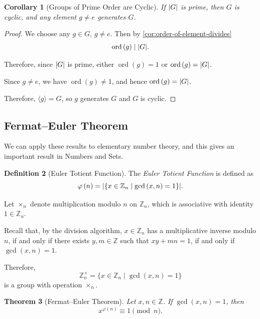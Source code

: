 \documentclass{article}
\newtheorem{theorem}{Theorem}[section]
\newtheorem{corollary}[theorem]{Corollary}
\theoremstyle{definition}
\newtheorem{definition}[theorem]{Definition}
\theoremstyle{remark}
\DeclarePairedDelimiter{\abs}{\lvert}{\rvert}
\newcommand{\pqty}[1]{\left(#1\right)}
\newcommand{\angBrac}[1]{\langle #1\rangle}
\newcommand{\set}[2]{\{#1\mid #2\}}
\newcommand{\divides}{\mid}
\newcommand{\ZZ}{\mathbb{Z}}
\newcommand{\ord}{\operatorname{ord}}
\newcommand{\totient}{\varphi}
\begin{document}
\begin{corollary}[Groups of Prime Order are Cyclic]
    \label{cor:group-prime-order}%
    If \(\abs{G}\) is prime, then \(G\) is cyclic, and \emph{any} element \(g \neq e\) generates \(G\).
\end{corollary}

\begin{proof}
    We choose any \(g \in G\), \(g \neq e\). Then by \autoref{cor:order-of-element-divides}
    \[
        \ord \pqty{g} \divides \abs{G}.
    \]

    Therefore, since \(\abs{G}\) is prime, either \(\ord \pqty{g} = 1\) or \(\ord \pqty{g} = \abs{G}\).

    Since \(g \neq e\), we have \(\ord \pqty{g} \neq 1\), and hence \(\ord \pqty{g} = \abs{G}\).

    Therefore, \(\angBrac{g} = G\), so \(g\) generates \(G\) and \(G\) is cyclic.
\end{proof}

\subsection{Fermat--Euler Theorem}
\label{sec:femat-euler}

We can apply these results to elementary number theory, and this gives an important result in Numbers and Sets.

\begin{definition}[Euler Totient Function]
    \label{def:euler-totient}%
    The \emph{Euler Totient Function} is defined as
    \[
        \totient\pqty{n} = \abs{\set{x \in \ZZ_{n}}{\gcd\pqty{x, n} = 1}}.
    \]
\end{definition}

Let \(\times_{n}\) denote multiplication modulo \(n\) on \(\ZZ_n\), which is associative with identity \(1 \in \ZZ_n\).

Recall that, by the division algorithm, \(x \in \ZZ_n\) has a multiplicative inverse modulo \(n\), if and only if there exists \(y, m \in \ZZ\) such that \(xy + mn = 1\), if and only if \(\gcd\pqty{x, n} = 1\).

Therefore,
\[
    \ZZ_n^{\times} = \set{x \in \ZZ_n}{\gcd\pqty{x, n} = 1}
\]
is a group with operation \(\times_n\).

\begin{theorem}[Fermat--Euler Theorem]
    \label{thm:fermat-euler}%
    Let \(x, n \in \ZZ\). If \(\gcd\pqty{x, n} = 1\), then
    \[
        x^{\totient\pqty{n}} \equiv 1 \pmod{n}.
    \]
\end{theorem}
\end{document}
